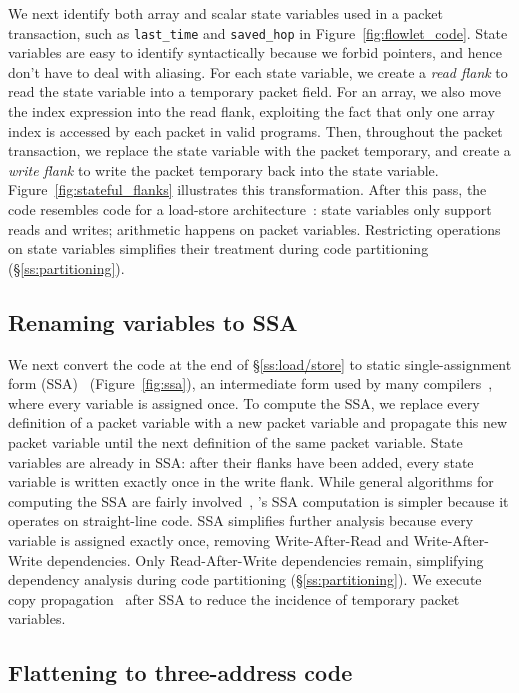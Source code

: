 We next identify both array and scalar state variables used in a packet
transaction, such as \texttt{last\_time} and \texttt{saved\_hop} in
Figure~\ref{fig:flowlet_code}. State variables are easy to identify syntactically
because we forbid pointers, and hence don't have to deal with aliasing. For
each state variable, we create a \textit{read flank} to read the state variable
into a temporary packet field. For an array, we also move the index expression
into the read flank, exploiting the fact that only one array index is accessed
by each packet in valid \pktlanguage programs.  Then, throughout the packet
transaction, we replace the state variable with the packet temporary, and
create a \textit{write flank} to write the packet temporary back into the state
variable.  Figure~\ref{fig:stateful_flanks} illustrates this transformation.
After this pass, the code resembles code for a load-store
architecture~\cite{load_store}: state variables only support reads and writes;
arithmetic happens on packet variables.  Restricting operations on state
variables simplifies their treatment during code partitioning
(\S\ref{ss:partitioning}).

\subsection{Renaming variables to SSA}
\label{ss:ssa}

We next convert the code at the end of \S\ref{ss:load/store} to static
single-assignment form (SSA)~\cite{ssa} (Figure~\ref{fig:ssa}), an intermediate
form used by many compilers~\cite{tree_ssa, llvm}, where every variable is
assigned once. To compute the SSA, we replace every definition of a packet
variable with a new packet variable and propagate this new packet variable
until the next definition of the same packet variable.  State variables are
already in SSA: after their flanks have been added, every state variable is
written exactly once in the write flank.  While general algorithms for
computing the SSA are fairly involved~\cite{ssa}, \pktlanguage's SSA
computation is simpler because it operates on straight-line code.  SSA
simplifies further analysis because every variable is assigned exactly once,
removing Write-After-Read and Write-After-Write dependencies. Only
Read-After-Write dependencies remain, simplifying dependency analysis during
code partitioning (\S\ref{ss:partitioning}). We execute copy
propagation~\cite{copy_prop} after SSA to reduce the incidence of temporary
packet variables.

\subsection{Flattening to three-address code}

